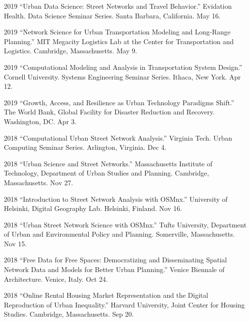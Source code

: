 \documentclass[12pt,letterpaper]{report}
\begin{document}
\begin{tablist}
        \item[2019] \tab \enquote{Urban Data Science: Street Networks and Travel Behavior.} Evidation Health. Data Science Seminar Series. Santa Barbara, California. May 16.

        \item[2019] \tab \enquote{Network Science for Urban Transportation Modeling and Long-Range Planning.} MIT Megacity Logistics Lab at the Center for Transportation and Logistics. Cambridge, Massachusetts. May 9.

        \item[2019] \tab \enquote{Computational Modeling and Analysis in Transportation System Design.} Cornell University. Systems Engineering Seminar Series. Ithaca, New York. Apr 12.

        \item[2019] \tab \enquote{Growth, Access, and Resilience as Urban Technology Paradigms Shift.} The World Bank, Global Facility for Disaster Reduction and Recovery. Washington, DC. Apr 3.

        \item[2018] \tab \enquote{Computational Urban Street Network Analysis.} Virginia Tech. Urban Computing Seminar Series. Arlington, Virginia. Dec 4.

        \item[2018] \tab \enquote{Urban Science and Street Networks.} Massachusetts Institute of Technology, Department of Urban Studies and Planning. Cambridge, Massachusetts. Nov 27.

        \item[2018] \tab \enquote{Introduction to Street Network Analysis with OSMnx.} University of Helsinki, Digital Geography Lab. Helsinki, Finland. Nov 16.

        \item[2018] \tab \enquote{Urban Street Network Science with OSMnx.} Tufts University, Department of Urban and Environmental Policy and Planning. Somerville, Massachusetts. Nov 15.

        \item[2018] \tab \enquote{Free Data for Free Spaces: Democratizing and Disseminating Spatial Network Data and Models for Better Urban Planning.} Venice Biennale of Architecture. Venice, Italy. Oct 24.

        \item[2018] \tab \enquote{Online Rental Housing Market Representation and the Digital Reproduction of Urban Inequality.} Harvard University, Joint Center for Housing Studies. Cambridge, Massachusetts. Sep 20.


\end{tablist}
\end{document}
